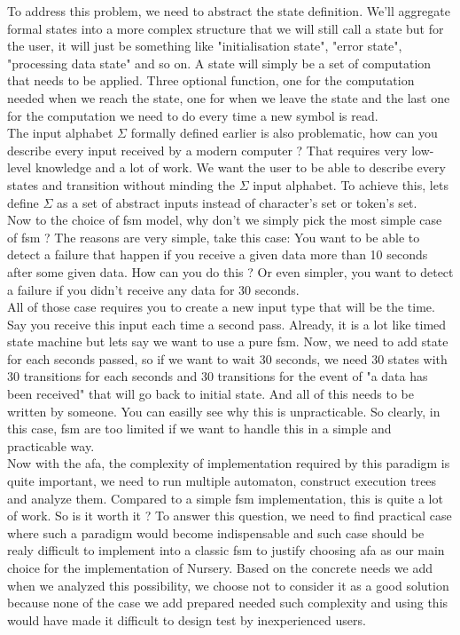 \documentclass[12pt]{article}
\begin{document}
To address this problem, we need to abstract the state definition. We'll aggregate formal states into a more complex structure that we will still call a state but for the user, it will just be something like "initialisation state", "error state", "processing data state" and so on. A state will simply be a set of computation that needs to be applied. Three optional function, one for the computation needed when we reach the state, one for when we leave the state and the last one for the computation we need to do every time a new symbol is read.\\

The input alphabet $\Sigma$ formally defined earlier is also problematic, how can you describe every input received by a modern computer ? That requires very low-level knowledge and a lot of work. We want the user to be able to describe every states and transition without minding the $\Sigma$ input alphabet. To achieve this, lets define $\Sigma$ as a set of abstract inputs instead of character's set or token's set.\\

Now to the choice of \gls{fsm} model, why don't we simply pick the most simple case of \gls{fsm} ? The reasons are very simple, take this case: You want to be able to detect a failure that happen if you receive a given data more than 10 seconds after some given data. How can you do this ? Or even simpler, you want to detect a failure if you didn't receive any data for 30 seconds.\\

All of those case requires you to create a new input type that will be the time. Say you receive this input each time a second pass. Already, it is a lot like timed state machine but lets say we want to use a pure \gls{fsm}. Now, we need to add state for each seconds passed, so if we want to wait 30 seconds, we need 30 states with 30 transitions for each seconds and 30 transitions for the event of "a data has been received" that will go back to initial state. And all of this needs to be written by someone. You can easilly see why this is unpracticable. So clearly, in this case, \gls{fsm} are too limited if we want to handle this in a simple and practicable way.\\

Now with the \gls{afa}, the complexity of implementation required by this paradigm is quite important, we need to run multiple automaton, construct execution trees and analyze them. Compared to a simple \gls{fsm} implementation, this is quite a lot of work. So is it worth it ? To answer this question, we need to find practical case where such a paradigm would become indispensable and such case should be realy difficult to implement into a classic \gls{fsm} to justify choosing \gls{afa} as our main choice for the implementation of Nursery. Based on the concrete needs we add when we analyzed this possibility, we choose not to consider it as a good solution because none of the case we add prepared needed such complexity and using this would have made it difficult to design test by inexperienced users.\\
\end{document}
